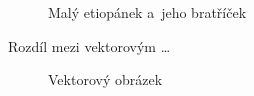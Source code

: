 \documentclass[a4paper,11pt]{article}
\begin{document}
\begin{figure}[h]
{ }
\caption{Malý etiopánek a~jeho bratříček}
\label{pic1}
\end{figure}

\newpage

Rozdíl mezi vektorovým \ldots
\begin{figure}[h]
\begin{center}
\caption{Vektorový obrázek}
\label{pic2}
\end{center}
\end{figure}
\end{document}
